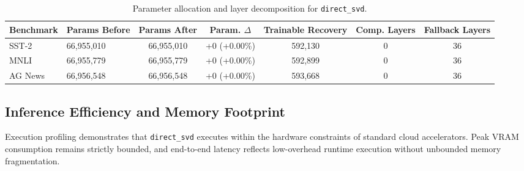 \begin{table}[t]
\centering
\small
\begin{tabular}{llccccc}
\toprule
\textbf{Benchmark} & \textbf{Params Before} & \textbf{Params After} & \textbf{Param. $\Delta$} & \textbf{Trainable Recovery} & \textbf{Comp. Layers} & \textbf{Fallback Layers} \\
\midrule
SST-2 & 66,955,010 & 66,955,010 & +0 (+0.00\%) & 592,130 & 0 & 36 \\
MNLI & 66,955,779 & 66,955,779 & +0 (+0.00\%) & 592,899 & 0 & 36 \\
AG News & 66,956,548 & 66,956,548 & +0 (+0.00\%) & 593,668 & 0 & 36 \\
\bottomrule
\end{tabular}
\caption{Parameter allocation and layer decomposition for \texttt{direct\_svd}.}
\label{tab:params_direct_svd}
\end{table}

\subsection{Inference Efficiency and Memory Footprint}
Execution profiling demonstrates that \texttt{direct\_svd} executes within the hardware constraints of standard cloud accelerators. Peak VRAM consumption remains strictly bounded, and end-to-end latency reflects low-overhead runtime execution without unbounded memory fragmentation.
